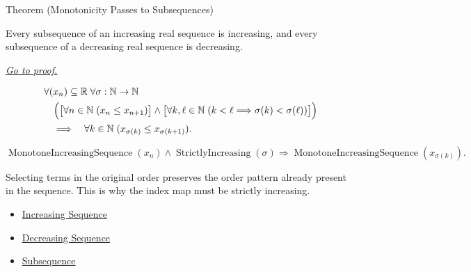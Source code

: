 \begin{theorembox}{Theorem (Monotonicity Passes to Subsequences)}
\begin{theorem}
\label{thm:monotonicity-passes-to-subsequences}
Every subsequence of an increasing real sequence is increasing, and every
subsequence of a decreasing real sequence is decreasing.

\smallskip
\noindent
\hyperref[prf:monotonicity-passes-to-subsequences]{\textit{Go to proof.}}
\end{theorem}
\end{theorembox}

\begin{remark*}
\[
\begin{aligned}
&\forall (x_n)\subseteq\mathbb{R}\;\forall \sigma:\mathbb{N}\to\mathbb{N}\\
&\quad\Bigl(
  \bigl[\forall n\in\mathbb{N}\;(x_n\le x_{n+1})\bigr]
  \land
  \bigl[\forall k,\ell\in\mathbb{N}\;(k<\ell\Longrightarrow\sigma(k)<\sigma(\ell))\bigr]
\Bigr)\\
&\quad\Longrightarrow\quad
\forall k\in\mathbb{N}\;(x_{\sigma(k)}\le x_{\sigma(k+1)}).
\end{aligned}
\]
\end{remark*}

\begin{remark*}
\[
\operatorname{MonotoneIncreasingSequence}(x_n)
\land
\operatorname{StrictlyIncreasing}(\sigma)
\Longrightarrow
\operatorname{MonotoneIncreasingSequence}(x_{\sigma(k)}).
\]
\end{remark*}

\begin{remark*}[Interpretation]
Selecting terms in the original order preserves the order pattern already
present in the sequence. This is why the index map must be strictly increasing.
\end{remark*}

\begin{dependencies}
\begin{itemize}
  \item \hyperref[def:increasing-sequence]{Increasing Sequence}
  \item \hyperref[def:decreasing-sequence]{Decreasing Sequence}
  \item \hyperref[def:subsequence]{Subsequence}
\end{itemize}
\end{dependencies}

